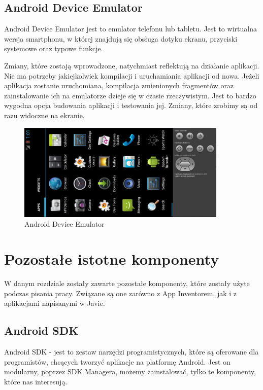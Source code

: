\subsection{Android Device Emulator}
\label{c223}

Android Device Emulator jest to emulator telefonu lub tabletu. Jest to wirtualna wersja smartphonu, w której znajdują się obsługa dotyku ekranu, przyciski systemowe oraz typowe funkcje.

Zmiany, które zostają wprowadzone, natychmiast reflektują na działanie aplikacji. Nie ma potrzeby jakiejkolwiek kompilacji i uruchamiania aplikacji od nowa. Jeżeli aplikacja zostanie uruchomiana, kompilacja zmienionych fragmentów oraz zainstalowanie ich na emulatorze dzieje się w czasie rzeczywistym. Jest to bardzo wygodna opcja budowania aplikacji i testowania jej. Zmiany, które zrobimy są od razu widoczne na ekranie.

\begin{figure}[th] 
\centering\includegraphics[width=10cm]{figures/emulator}
\caption{Android Device Emulator}
\end{figure}

\section{Pozostałe istotne komponenty}

W danym rozdziale zostały zawarte pozostałe komponenty, które zostały użyte podczas pisania pracy. Związane są one zarówno z App Inventorem, jak i z aplikacjami napisanymi w Javie.

\subsection{Android SDK}

Android SDK - jest to zestaw narzędzi programistycznych, które są oferowane dla programistów, chcących tworzyć aplikacje na platformę Android. Jest on modularny, poprzez SDK Managera, możemy zainstalować, tylko te komponenty, które nas interesują. 

